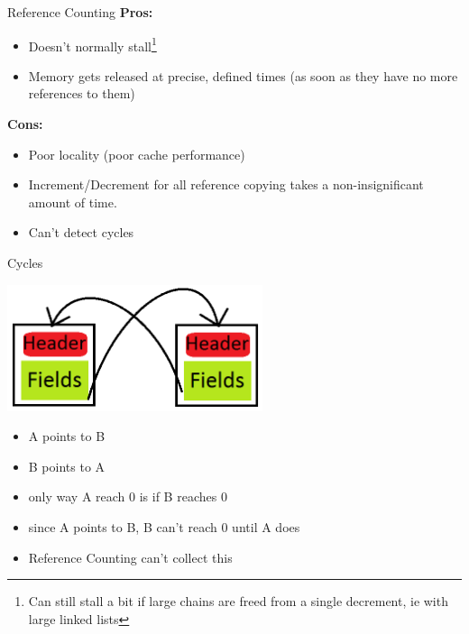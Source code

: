 \documentclass{beamer}
\begin{document}
\begin{frame}{Reference Counting}
	\textbf{Pros:}
	\begin{itemize}
		\item Doesn't normally stall\footnote{Can still stall a bit if large chains are freed from a single decrement, ie with large linked lists}
		\item Memory gets released at precise, defined times (as soon as they have no more references to them)
	\end{itemize}
	\textbf{Cons:}
	\begin{itemize}
		\item Poor locality (poor cache performance)
		\item Increment/Decrement for all reference copying takes a non-insignificant amount of time.
		\item Can't detect cycles
	\end{itemize}
\end{frame}


\begin{frame}{Cycles}
	\begin{center}
		\includegraphics[width=75mm]{graphics/cycles.png}
	\end{center}
	\begin{itemize}
		\item A points to B
		\item B points to A
		\item only way A reach 0 is if B reaches 0
		\item since A points to B, B can't reach 0 until A does
		\item Reference Counting can't collect this
	\end{itemize}
\end{frame}
\end{document}
